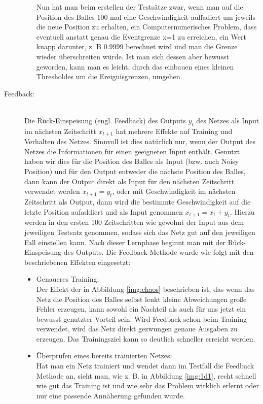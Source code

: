 \begin{description}
\begin{itemize}
		Nun hat man beim erstellen der Testsätze zwar, wenn man auf die Position des Balles 100 mal eine Geschwindigkeit auffadiert um jeweils die neue Position zu erhalten, ein Computernumerisches Problem, dass eventuell anstatt genau die Eventgrenze x=1 zu erreichen, ein Wert knapp darunter, z. B 0.9999 berechnet wird und man die Grenze wieder überschreiten würde. Ist man sich dessen aber bewusst geworden, kann man es leicht, durch das einbauen eines kleinen Thresholdes um die Ereignisgrenzen, umgehen. 
	\end{itemize}
	\item[Feedback:]\hfill \\
	Die Rück-Einspeisung (engl. Feedback) des Outputs $ y_{t} $ des Netzes als Input im nächsten Zeitschritt $ x_{t+1} $ hat mehrere Effekte auf Training und Verhalten des Netzes. Sinnvoll ist dies natürlich nur, wenn der Output des Netzes die Informationen für einen geeigneten Input enthält. Genutzt haben wir dies für die Position des Balles als Input (bzw. auch Noisy Position) und für den Output entweder die nächste Position des Balles, dann kann der Output direkt als Input für den nächsten Zeitschritt verwendet werden $ x_{t+1} = y_{t} $, oder mit Geschwindigkeit im nächsten Zeitschritt als Output, dann wird die bestimmte Geschwindigkeit auf die letzte Position aufaddiert und als Input genommen  $ x_{t+1} = x_{t}+y_{t} $. Hierzu werden in den ersten 100 Zeitschritten wie gewohnt der Input aus dem jeweiligen Testsatz genommen, sodass sich das Netz gut auf den jeweiligen Fall einstellen kann. Nach dieser Lernphase beginnt man mit der Rück-Einspeisung des Outputs. Die Feedback-Methode wurde wie folgt mit den beschriebenen Effekten eingesetzt: \hfill \\
	\begin{itemize}
		\item Genaueres Training: \hfill \\
		 Der Effekt der in Abbildung \ref{img:chaos} beschrieben ist, das wenn das Netz die Position des Balles selbst lenkt kleine Abweichungen große Fehler erzeugen, kann sowohl ein Nachteil als auch für uns jetzt ein bewusst genutzter Vorteil sein. Wird Feedback schon beim Training verwendet, wird das Netz direkt gezwungen genaue Ausgaben zu erzeugen. Das Trainingsziel kann so deutlich schneller erreicht werden. 
		\item Überprüfen eines bereits trainierten Netzes: \hfill \\
		 Hat man ein Netz trainiert und wendet dann im Testfall die Feedback Methode an, sieht man, wie z. B. in Abbildung \ref{img:1d1}, recht schnell wie gut das Training ist und wie sehr das Problem wirklich erlernt oder nur eine passende Annäherung gefunden wurde. 

\end{itemize}
\end{description}
